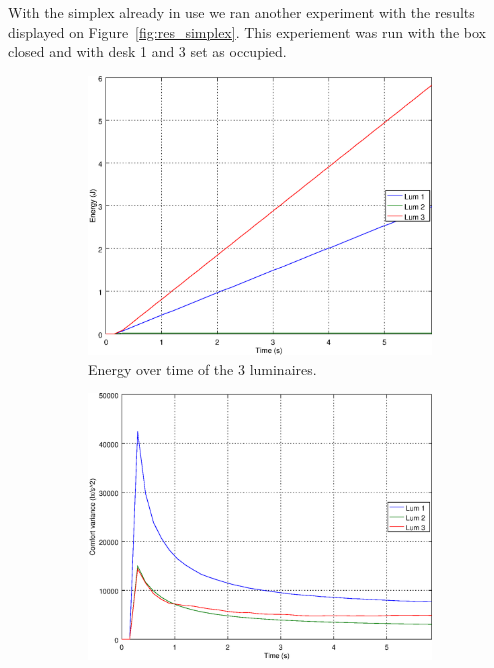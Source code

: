 With the simplex already in use we ran another experiment with the results displayed on Figure~\ref{fig:res_simplex}. This experiement was run with the box closed and with desk 1 and 3 set as occupied.

\begin{figure}[ht]
    \centering
    \begin{subfigure}[t]{0.32\textwidth}
    \centering
    \includegraphics[width=.95\textwidth]{img/e_}
    \caption{Energy over time of the 3 luminaires.}
    \label{fig:e_}
    \end{subfigure}
    \begin{subfigure}[t]{0.32\textwidth}
    \centering
    \includegraphics[width=.95\textwidth]{img/f_}

\end{subfigure}
\end{figure}
